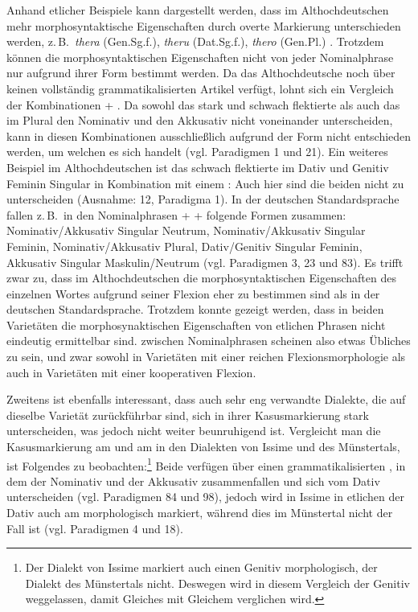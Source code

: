 Anhand etlicher Beispiele kann dargestellt werden, dass im Althochdeutschen mehr morphosyntaktische Eigenschaften durch overte Markierung unterschieden werden, z.\,B.\ \textit{thera} (Gen.Sg.f.), \textit{theru} (Dat.Sg.f.), \textit{thero} (Gen.Pl.) \citep[108]{Szczepaniak2011}. Trotzdem können die morphosyntaktischen Eigenschaften nicht von jeder Nominalphrase nur aufgrund ihrer Form bestimmt werden. Da das Althochdeutsche noch über keinen vollständig grammatikalisierten Artikel verfügt, lohnt sich ein Vergleich der Kombinationen  + . Da sowohl das stark und schwach flektierte  als auch das  im Plural den Nominativ und den Akkusativ nicht voneinander unterscheiden, kann in diesen Kombinationen ausschließlich aufgrund der Form nicht entschieden werden, um welchen  es sich handelt (vgl. Paradigmen 1 und 21). Ein weiteres Beispiel im Althochdeutschen ist das schwach flektierte  im Dativ und Genitiv Feminin Singular in Kombination mit einem : Auch hier sind die beiden  nicht zu unterscheiden (Ausnahme:  12, Paradigma 1). In der deutschen Standardsprache fallen z.\,B.\ in den Nominalphrasen  +  +  folgende Formen zusammen: Nominativ/Akkusativ Singular Neutrum, Nominativ/Akkusativ Singular Feminin, Nominativ/Akkusativ Plural, Dativ/Genitiv Singular Feminin, Akkusativ Singular Maskulin/Neutrum (vgl. Paradigmen 3, 23 und 83). Es trifft zwar zu, dass im Althochdeutschen die morphosyntaktischen Eigenschaften des einzelnen Wortes aufgrund seiner Flexion eher zu bestimmen sind als in der deutschen Standardsprache. Trotzdem konnte gezeigt werden, dass in beiden Varietäten die morphosynaktischen Eigenschaften von etlichen Phrasen nicht eindeutig ermittelbar sind.  zwischen Nominalphrasen scheinen also etwas Übliches zu sein, und zwar sowohl in Varietäten mit einer reichen Flexionsmorphologie als auch in Varietäten mit einer kooperativen Flexion.

Zweitens ist ebenfalls interessant, dass auch sehr eng verwandte Dialekte, die auf dieselbe Varietät zurückführbar sind, sich in ihrer Kasusmarkierung stark unterscheiden, was jedoch nicht weiter beunruhigend ist. Vergleicht man die Kasusmarkierung am  und am  in den Dialekten von Issime und des Münstertals, ist Folgendes zu beobachten:\footnote{Der Dialekt von Issime markiert auch einen Genitiv morphologisch, der Dialekt des Münstertals nicht. Deswegen wird in diesem Vergleich der Genitiv weggelassen, damit Gleiches mit Gleichem verglichen wird.} Beide verfügen über einen grammatikalisierten , in dem der Nominativ und der Akkusativ zusammenfallen und sich vom Dativ unterscheiden (vgl. Paradigmen 84 und 98), jedoch wird in Issime in etlichen  der Dativ auch am  morphologisch markiert, während dies im Münstertal nicht der Fall ist (vgl. Paradigmen 4 und 18).

